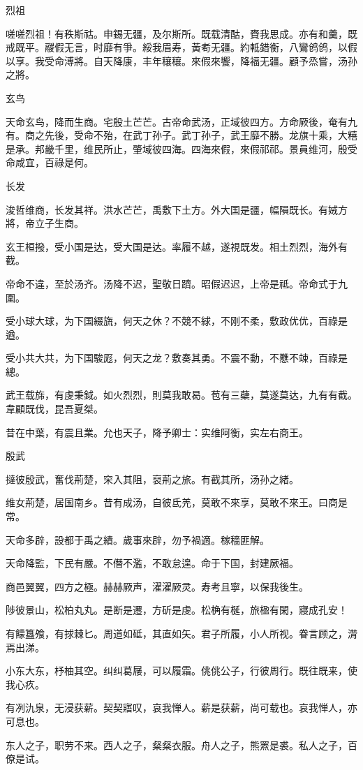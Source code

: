烈祖

嗟嗟烈祖！有秩斯祜。申錫无疆，及尔斯所。既载清酤，賚我思成。亦有和羹，既戒既平。鬷假无言，时靡有爭。綏我眉寿，黃耇无疆。約軧錯衡，八鸞鸧鸧，以假以享。我受命溥將。自天降康，丰年穰穰。來假來饗，降福无疆。顧予烝嘗，汤孙之將。

玄鸟

天命玄鸟，降而生商。宅殷土芒芒。古帝命武汤，正域彼四方。方命厥後，奄有九有。商之先後，受命不殆，在武丁孙子。武丁孙子，武王靡不勝。龙旗十乘，大糦是承。邦畿千里，维民所止，肇域彼四海。四海來假，來假祁祁。景員维河，殷受命咸宜，百祿是何。

长发

浚哲维商，长发其祥。洪水芒芒，禹敷下土方。外大国是疆，幅隕既长。有娀方將，帝立子生商。

玄王桓撥，受小国是达，受大国是达。率履不越，遂視既发。相土烈烈，海外有截。

帝命不違，至於汤齐。汤降不迟，聖敬日躋。昭假迟迟，上帝是祗。帝命式于九圍。

受小球大球，为下国綴旒，何天之休？不競不絿，不刚不柔，敷政优优，百祿是遒。

受小共大共，为下国駿厖，何天之龙？敷奏其勇。不震不動，不戁不竦，百祿是總。

武王载旆，有虔秉鉞。如火烈烈，則莫我敢曷。苞有三蘗，莫遂莫达，九有有截。韋顧既伐，昆吾夏桀。

昔在中葉，有震且業。允也天子，降予卿士：实维阿衡，实左右商王。

殷武

撻彼殷武，奮伐荊楚，穼入其阻，裒荊之旅。有截其所，汤孙之緒。

维女荊楚，居国南乡。昔有成汤，自彼氐羌，莫敢不來享，莫敢不來王。曰商是常。

天命多辟，設都于禹之績。歲事來辟，勿予禍適。稼穡匪解。

天命降監，下民有嚴。不僭不濫，不敢怠遑。命于下国，封建厥福。

商邑翼翼，四方之極。赫赫厥声，濯濯厥灵。寿考且寧，以保我後生。

陟彼景山，松柏丸丸。是断是遷，方斫是虔。松桷有梴，旅楹有閑，寢成孔安！

有饛簋飧，有捄棘匕。周道如砥，其直如矢。君子所履，小人所视。眷言顾之，潸焉出涕。

小东大东，杼柚其空。纠纠葛屦，可以履霜。佻佻公子，行彼周行。既往既来，使我心疚。

有冽氿泉，无浸获薪。契契寤叹，哀我惮人。薪是获薪，尚可载也。哀我惮人，亦可息也。

东人之子，职劳不来。西人之子，粲粲衣服。舟人之子，熊罴是裘。私人之子，百僚是试。

